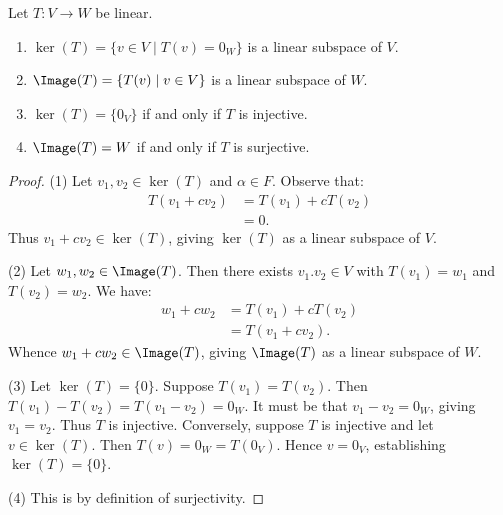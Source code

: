     \begin{proposition}
        Let $T:V \rightarrow W$ be linear.
            \begin{enumerate}[label = (\arabic*),itemsep=1pt,topsep=3pt]
                \item $\ker(T) = \{v \in V \mid T(v) = 0_W\}$ is a linear subspace of $V$.
                \item $\Image(T) = \{T(v) \mid v \in V\}$ is a linear subspace of $W$.
                \item $\ker(T) = \{0_V\}$ if and only if $T$ is injective.
                \item $\Image(T) = W$ if and only if $T$ is surjective.
            \end{enumerate}
    \end{proposition}
        \begin{proof}
            (1) Let $v_1,v_2 \in \ker(T)$ and $\alpha \in F$. Observe that:
                \begin{equation*}
                \begin{split}
                    T(v_1 + cv_2)
                    & = T(v_1) + cT(v_2) \\
                    & = 0.
                \end{split}
                \end{equation*}
            Thus $v_1 + cv_2 \in \ker(T)$, giving $\ker(T)$ as a linear subspace of $V$.

            (2) Let $w_1,w_2 \in \Image(T)$. Then there exists $v_1.v_2 \in V$ with $T(v_1) = w_1$ and $T(v_2) = w_2$. We have:
                \begin{equation*}
                \begin{split}
                    w_1 + cw_2 
                    & = T(v_1) + cT(v_2) \\
                    & = T(v_1 + cv_2).
                \end{split}
                \end{equation*}
            Whence $w_1 + cw_2 \in \Image(T)$, giving $\Image(T)$ as a linear subspace of $W$.

            (3) Let $\ker(T) = \{0\}$. Suppose $T(v_1) = T(v_2)$. Then $T(v_1) - T(v_2) = T(v_1 - v_2) = 0_W$. It must be that $v_1 -v_2 = 0_W$, giving $v_1 = v_2$. Thus $T$ is injective. Conversely, suppose $T$ is injective and let $v \in \ker(T)$. Then $T(v) = 0_W = T(0_V)$. Hence $v = 0_V$, establishing $\ker(T) = \{0\}$.

            (4) This is by definition of surjectivity.
        \end{proof}

